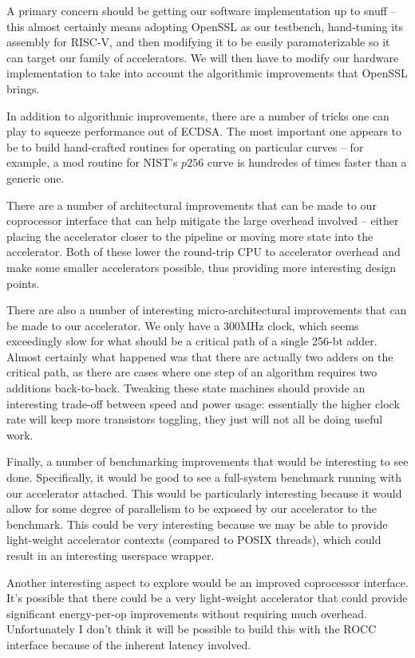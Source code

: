 \documentclass[twocolumn]{article}
\begin{document}
A primary concern should be getting our software
implementation up to snuff -- this almost certainly means adopting
OpenSSL as our testbench, hand-tuning its assembly for RISC-V, and
then modifying it to be easily paramaterizable so it can target our
family of accelerators. We will then have to modify our hardware 
implementation to take into account the algorithmic improvements that 
OpenSSL brings.

In addition to algorithmic improvements, there are a number of tricks
one can play to squeeze performance out of ECDSA.  The most important
one appears to be to build hand-crafted routines for operating on
particular curves -- for example, a mod routine for NIST's $p256$
curve is hundredes of times faster than a generic
one\cite{nist-routines}.

There are a number of architectural improvements that can be made to
our coprocessor interface that can help mitigate the large overhead
involved -- either placing the accelerator closer to the pipeline or
moving more state into the accelerator.  Both of these lower the
round-trip CPU to accelerator overhead and make some smaller
accelerators possible, thus providing more interesting design points.

There are also a number of interesting micro-architectural
improvements that can be made to our accelerator.  We only have a
300MHz clock, which seems exceedingly slow for what should be a
critical path of a single 256-bt adder.  Almost certainly what
happened was that there are actually two adders on the critical path,
as there are cases where one step of an algorithm requires two
additions back-to-back.  Tweaking these state machines should provide
an interesting trade-off between speed and power usage: essentially
the higher clock rate will keep more transistors toggling, they just
will not all be doing useful work.

Finally, a number of benchmarking improvements that would be
interesting to see done.  Specifically, it would be good to see a
full-system benchmark running with our accelerator attached.  This
would be particularly interesting because it would allow for some
degree of parallelism to be exposed by our accelerator to the
benchmark.  This could be very interesting because we may be able to
provide light-weight accelerator contexts (compared to POSIX threads),
which could result in an interesting userspace wrapper.

Another interesting aspect to explore would be an improved coprocessor
interface.  It's possible that there could be a very light-weight
accelerator that could provide significant energy-per-op improvements
without requiring much overhead.  Unfortunately I don't think it will
be possible to build this with the ROCC interface because of the
inherent latency involved.
\end{document}

